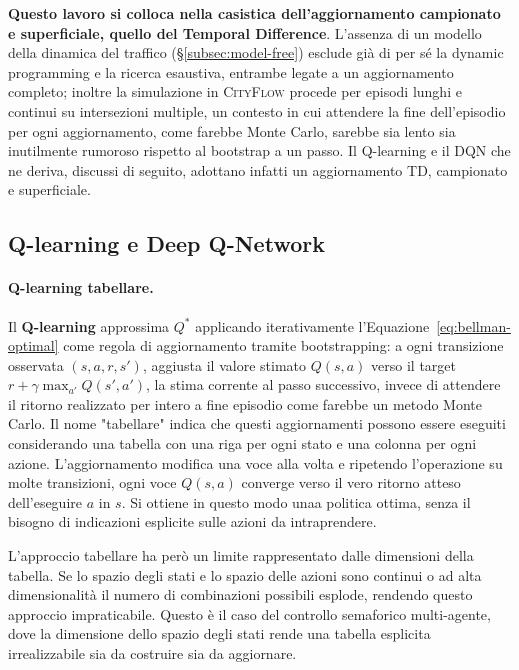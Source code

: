 \textbf{Questo lavoro si colloca nella casistica dell'aggiornamento campionato e superficiale, quello del Temporal Difference}.
L'assenza di un modello della dinamica del traffico (§\ref{subsec:model-free}) esclude
già di per sé la dynamic programming e la ricerca esaustiva, entrambe
legate a un aggiornamento completo; inoltre la simulazione in \textsc{CityFlow} procede
per episodi lunghi e continui su intersezioni multiple, un contesto in
cui attendere la fine dell'episodio per ogni aggiornamento, come farebbe
Monte Carlo, sarebbe sia lento sia inutilmente rumoroso rispetto al
bootstrap a un passo. Il Q-learning e il DQN che ne deriva, discussi di
seguito, adottano infatti un aggiornamento TD, campionato e superficiale.

\subsection{Q-learning e Deep Q-Network}

\paragraph{Q-learning tabellare.} Il \textbf{Q-learning} approssima $Q^*$
applicando iterativamente l'Equazione~\ref{eq:bellman-optimal} come
regola di aggiornamento tramite bootstrapping: a ogni transizione
osservata $(s,a,r,s')$, aggiusta il valore stimato $Q(s,a)$ verso il
target $r + \gamma \max_{a'} Q(s',a')$, la stima corrente al passo
successivo, invece di attendere il ritorno realizzato per intero a fine
episodio come farebbe un metodo Monte Carlo. Il nome "tabellare" indica
che questi aggiornamenti possono essere eseguiti considerando una tabella con una riga per ogni stato e una
colonna per ogni azione. L'aggiornamento modifica una voce alla volta e
ripetendo l'operazione su molte transizioni, ogni voce $Q(s,a)$ converge verso il
vero ritorno atteso dell'eseguire $a$ in $s$. Si ottiene in questo modo unaa politica
ottima, senza il bisogno di indicazioni esplicite sulle azioni da intraprendere.

L'approccio tabellare ha però un limite rappresentato dalle dimensioni della tabella.
Se lo spazio degli stati e lo spazio delle azioni sono continui o ad alta dimensionalità il numero di combinazioni possibili esplode,
rendendo questo approccio impraticabile.
Questo è il caso del controllo semaforico multi-agente, dove la dimensione dello spazio degli stati rende una
tabella esplicita irrealizzabile sia da costruire sia da aggiornare.

